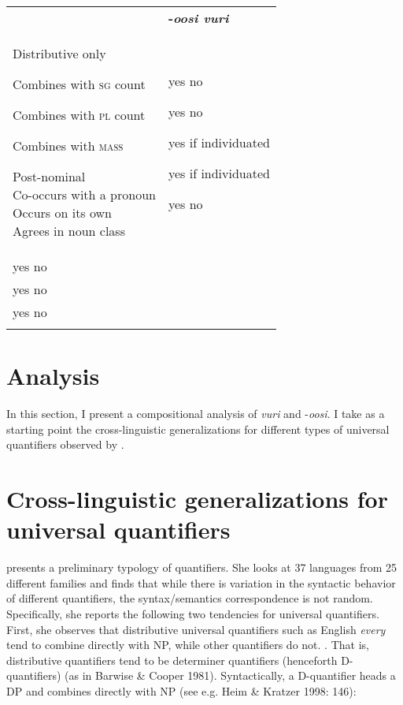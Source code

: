 \documentclass[output=paper]{langsci/langscibook}
\begin{document}
\begin{tabularx}{\textwidth}{XX} & {\bfseries {}-\textit{oosi  vuri}}\\
\lsptoprule
{\mdseries Distributive only}

{\mdseries Combines with \textsc{sg} count}

{\mdseries Combines with \textsc{pl} count}

{\mdseries Combines with \textsc{mass}}

{\mdseries Post-nominal\\
Co-occurs with a pronoun\\
Occurs on its own\\
Agrees in noun class} & yes  no 

yes  no

yes  if individuated

yes  if individuated

yes  no\\
yes  no\\
yes  no\\
yes  no  \\
\lspbottomrule
\end{tabularx}
\section{ Analysis}

In this section, I present a compositional analysis of \textit{vuri }and -\textit{oosi}. I take as a starting point the cross-linguistic generalizations for different types of universal quantifiers observed by \citet{Matthewson2013}. 

\section{Cross-linguistic generalizations for universal quantifiers}

\citet{Matthewson2013} presents a preliminary typology of quantifiers. She looks at 37 languages from 25 different families and finds that while there is variation in the syntactic behavior of different quantifiers, the syntax/semantics correspondence is not random. Specifically, she reports the following two tendencies for universal quantifiers. First, she observes that distributive universal quantifiers such as English \textit{every} tend to {\textquotedbl}combine directly with NP, while other quantifiers do not.{\textquotedbl} \citep[36]{Matthewson2013}. That is, distributive quantifiers tend to be determiner quantifiers (henceforth D-quantifiers) (as in Barwise \& Cooper 1981). Syntactically, a D-quantifier heads a DP and combines directly with NP (see e.g. Heim \& Kratzer 1998: 146): 
\end{document}
